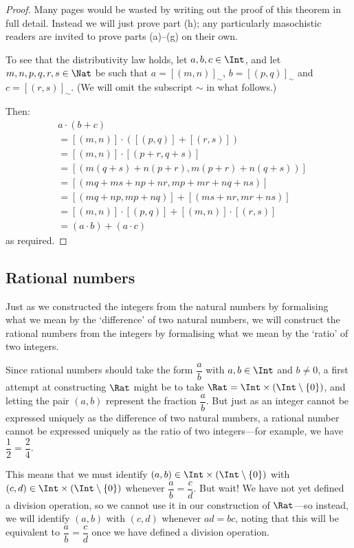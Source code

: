 \begin{proof}
Many pages would be wasted by writing out the proof of this theorem in full detail. Instead we will just prove part (h); any particularly masochistic readers are invited to prove parts (a)--(g) on their own.

To see that the distributivity law holds, let $a,b,c \in \Int$, and let $m,n,p,q,r,s \in \Nat$ be such that $a = [(m,n)]_{\sim}$, $b = [(p,q)]_{\sim}$ and $c = [(r,s)]_{\sim}$. (We will omit the subscript $\sim$ in what follows.)

Then:
\begin{align*}
& a \cdot (b + c) \\
&= [(m,n)] \cdot ([(p,q)] + [(r,s)]) \\
&= [(m,n)] \cdot [(p+r,q+s)] \\
&= [(m(q+s)+n(p+r), m(p+r) + n(q+s))] \\
&= [(mq+ms+np+nr, mp+mr+nq+ns)] \\
&= [(mq+np, mp+nq)] + [(ms+nr, mr+ns)] \\
&= [(m,n)] \cdot [(p,q)] + [(m,n)] \cdot [(r,s)] \\
&= (a \cdot b) + (a \cdot c)
\end{align*}
as required.
\end{proof}

\subsection*{Rational numbers}

Just as we constructed the integers from the natural numbers by formalising what we mean by the `difference' of two natural numbers, we will construct the rational numbers from the integers by formalising what we mean by the `ratio' of two integers.

Since rational numbers should take the form $\dfrac{a}{b}$ with $a,b \in \Int$ and $b \ne 0$, a first attempt at constructing $\Rat$ might be to take $\Rat = \Int \times (\Int \setminus \{ 0 \})$, and letting the pair $(a,b)$ represent the fraction $\dfrac{a}{b}$. But just as an integer cannot be expressed uniquely as the difference of two natural numbers, a rational number cannot be expressed uniquely as the ratio of two integers---for example, we have $\dfrac{1}{2} = \dfrac{2}{4}$.

This means that we must identify $(a,b) \in \Int \times (\Int \setminus \{ 0 \})$ with $(c,d) \in \Int \times (\Int \setminus \{ 0 \})$ whenever $\dfrac{a}{b} = \dfrac{c}{d}$. But wait! We have not yet defined a division operation, so we cannot use it in our construction of $\Rat$---so instead, we will identify $(a,b)$ with $(c,d)$ whenever $ad=bc$, noting that this will be equivalent to $\dfrac{a}{b} = \dfrac{c}{d}$ once we have defined a division operation.

